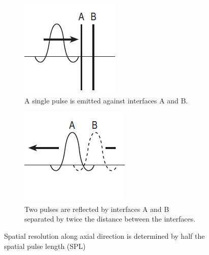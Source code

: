 \documentclass[11pt]{article} %
\begin{document}
	\begin{figure}
	\centering
		\begin{subfigure}{0.3\textwidth}
		\centering
		\includegraphics[width=\textwidth]{figuras/resolution1.png}
		\caption{A single pulse is emitted against interfaces A and B.}
		\end{subfigure}
		\centering
		\begin{subfigure}{0.3\textwidth}
		\centering
		\includegraphics[width=\textwidth]{figuras/resolution2.png}
		\caption{Two pulses are reflected by interfaces A and B separated by twice 		        the distance between the interfaces.}
		\end{subfigure}	
	\caption{Spatial resolution along axial direction is determined by half the spatial pulse length (SPL) \cite{farr}}
	\end{figure}
\end{document}
